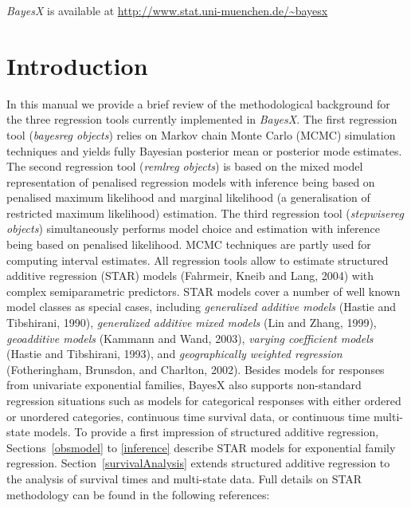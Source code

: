 \documentclass[11pt,a4paper,twoside]{bayesxarticle}
\begin{document}
\vspace{0.5cm}

{\em BayesX} is available at {
\href{http://www.stat.uni-muenchen.de/~bayesx}{http://www.stat.uni-muenchen.de/\~{}bayesx}}

\newpage

\section{Introduction}

In this manual we provide a brief review of the methodological
background for the three regression tools currently implemented in
{\em BayesX}. The first regression tool ({\em bayesreg objects})
relies on Markov chain Monte Carlo (MCMC) simulation techniques and
yields fully Bayesian posterior mean or posterior mode estimates.
The second regression tool ({\em remlreg objects}) is based on the
mixed model representation of penalised regression models with
inference being based on penalised maximum likelihood and marginal
likelihood (a generalisation of restricted maximum likelihood)
estimation. The third regression tool ({\em stepwisereg objects})
simultaneously performs model choice and estimation with inference
being based on penalised likelihood. MCMC techniques are partly used
for computing interval estimates. All regression tools allow to
estimate structured additive regression (STAR) models (Fahrmeir,
Kneib and Lang, 2004) with complex semiparametric predictors. STAR
models cover a number of well known model classes as special cases,
including {\em generalized additive models} (Hastie and Tibshirani,
1990), {\em generalized additive mixed models} (Lin and Zhang,
1999), {\em geoadditive models} (Kammann and Wand, 2003), {\em
varying coefficient models} (Hastie and Tibshirani, 1993), and {\em
geographically weighted regression} (Fotheringham, Brunsdon, and
Charlton, 2002). Besides models for responses from univariate
exponential families, BayesX also supports non-standard regression
situations such as models for categorical responses with either
ordered or unordered categories, continuous time survival data, or
continuous time multi-state models. To provide a first impression of
structured additive regression, Sections~\ref{obsmodel} to
\ref{inference} describe STAR models for exponential family
regression. Section~\ref{survivalAnalysis} extends structured
additive regression to the analysis of survival times and
multi-state data. Full details on STAR methodology can be found in
the following references:
\end{document}
